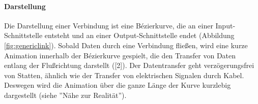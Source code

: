 \paragraph{Darstellung} Die Darstellung einer Verbindung ist eine Bézierkurve, die an einer Input-Schnittstelle entsteht und an einer Output-Schnittstelle endet (Abbildung \ref{fig:genericlink}). Sobald Daten durch eine Verbindung fließen, wird eine kurze Animation innerhalb der Bézierkurve gespielt, die den Transfer von Daten entlang der Flußrichtung darstellt ([2]). Der Datentransfer geht verzögerungsfrei von Statten, ähnlich wie der Transfer von elektrischen Signalen durch Kabel. Deswegen wird die Animation über die ganze Länge der Kurve kurzlebig dargestellt (siehe ''Nähe zur Realität'').


